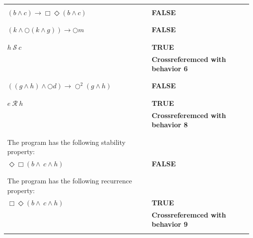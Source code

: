 \documentclass[12pt]{article}
\begin{document}
\begin{enumerate}
\begin{table}
\begin{tabular}{|l|l|}
\hline

&\\
		
$(b \wedge c) \rightarrow \Box \Diamond (b \wedge c)$ 
 &\textbf{FALSE}\\
&\\

\hline

&\\
		
$(k \wedge \bigcirc (k \wedge g)) \rightarrow \bigcirc m$ 
 &\textbf{FALSE}\\
&\\

\hline

&\\
		
$ h ~\mathcal{S}~ c$							
 &\textbf{TRUE}\\
 &\textbf{Crossreferemced with behavior 6}\\
&\\

\hline

&\\
		
$ ((g \wedge h) \wedge \bigcirc d) \rightarrow \bigcirc^{2} (g \wedge h)$
 &\textbf{FALSE}\\
&\\

\hline

&\\
		
$e ~\mathcal{R}~ h$								
 &\textbf{TRUE}\\
 &\textbf{Crossreferemced with behavior 8}\\
&\\

\hline

&\\
		
The program has the following stability property: &\\
$\Diamond \Box (b \wedge \ c \wedge h)$		
 &\textbf{FALSE}\\
&\\

\hline

&\\
		
The program has the following recurrence property: &\\
$\Box \Diamond (b \wedge \ c \wedge h)$		
 &\textbf{TRUE}\\
 &\textbf{Crossreferemced with behavior 9}\\
&\\


\end{tabular}
\end{table}
\end{enumerate}
\end{document}
